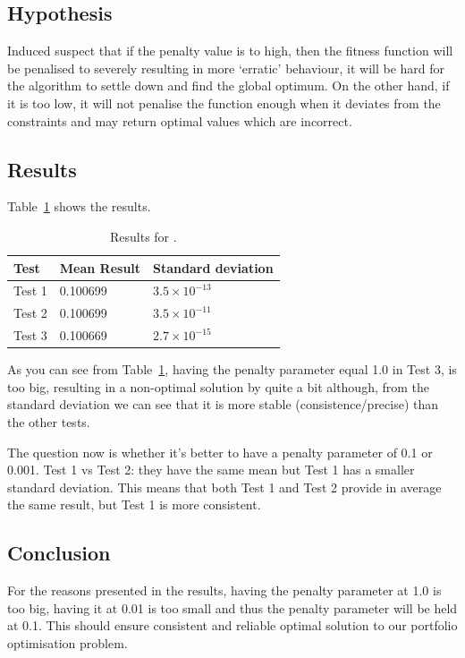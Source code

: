 \documentclass{pdfmx4020}
\begin{document}
    \subsection{Hypothesis}
    Induced suspect that if the penalty value is to high, then the fitness function will be penalised to severely resulting in more `erratic' behaviour, it will be hard for the algorithm to settle down and find the global optimum. On the other hand, if it is too low, it will not penalise the function enough when it deviates from the constraints and may return optimal values which are incorrect. 

    \subsection{Results}
      Table~\ref{table:penalty_results} shows the results. 
        \begin{table}[H]
          \setlength{\extrarowheight}{2.0pt}
          \begin{tabular}{|l|l|l|}
            \hline
            Test & Mean Result & Standard deviation \\
            \hline
            Test 1 & 0.100699 & $3.5\times10^{-13}$ \\
            \hline
            Test 2 & 0.100699 & $3.5\times10^{-11}$ \\
            \hline
            Test 3 & 0.100669 & $2.7\times10^{-15}$ \\
            \hline
          \end{tabular}
          \caption{Results for .}
          \label{table:penalty_results}
        \end{table}
      As you can see from Table~\ref{table:penalty_results}, having the penalty parameter equal 1.0 in Test 3, is too big, resulting in a non-optimal solution by quite a bit although, from the standard deviation we can see that it is more stable (consistence/precise) than the other tests. 

      The question now is whether it's better to have a penalty parameter of 0.1 or 0.001. Test 1 vs Test 2: they have the same mean but Test 1 has a smaller standard deviation. This means that both Test 1 and Test 2 provide in average the same result, but Test 1 is more consistent.

    \subsection{Conclusion}
      For the reasons presented in the results, having the penalty parameter at 1.0 is too big, having it at 0.01 is too small and thus the penalty parameter will be held at 0.1. This should ensure consistent and reliable optimal solution to our portfolio optimisation problem.
\end{document}
